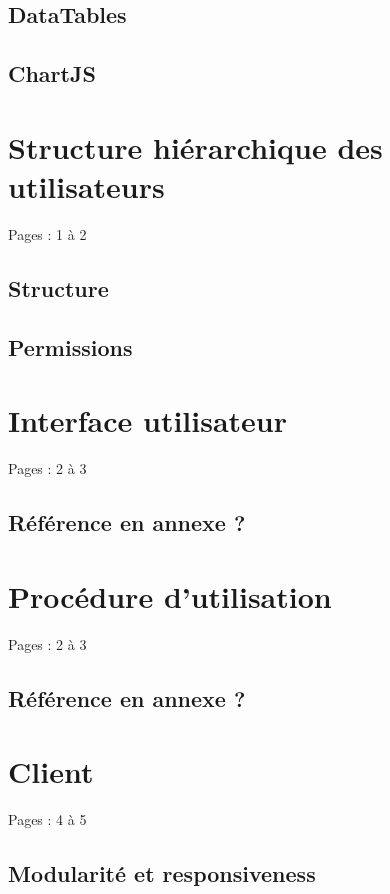 \documentclass{eplmastersthesis_FR}
\begin{document}
			\subsection*{DataTables}
			\subsection*{ChartJS}

		\section{Structure hiérarchique des utilisateurs}

			Pages : 1 à 2

			\subsection*{Structure}
			\subsection*{Permissions}

		\section{Interface utilisateur}

			Pages : 2 à 3

			\subsection*{Référence en annexe ?}

		\section{Procédure d'utilisation}

			Pages : 2 à 3

			\subsection*{Référence en annexe ?}

		\section{Client}

			Pages : 4 à 5
			\subsection*{Modularité et responsiveness}
\end{document}
